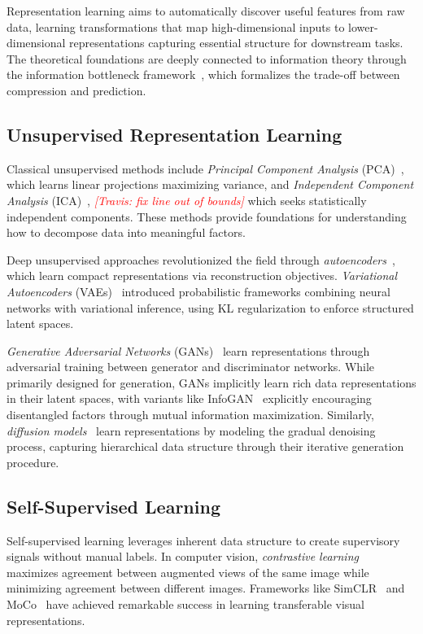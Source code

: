 \documentclass[11pt, oneside]{book}
\theoremstyle{plain}
\theoremstyle{definition}
\theoremstyle{remark}
\newcommand{\travis}[1]{\textcolor{red}{{\it [Travis: #1]}}}
\begin{document}
Representation learning aims to automatically discover useful features from raw data, learning transformations that map high-dimensional inputs to lower-dimensional representations capturing essential structure for downstream tasks. The theoretical foundations are deeply connected to information theory through the information bottleneck framework~\citep{tishby2000information}, which formalizes the trade-off between compression and prediction.

\subsection{Unsupervised Representation Learning}

Classical unsupervised methods include \emph{Principal Component Analysis} (PCA)~\citep{pearson1901liii}, which learns linear projections maximizing variance, and \emph{Independent Component Analysis} (ICA)~\citep{hyvarinen2000independent}, \travis{fix line out of bounds} which seeks statistically independent components. These methods provide foundations for understanding how to decompose data into meaningful factors.

Deep unsupervised approaches revolutionized the field through \emph{autoencoders}~\citep{hinton2006reducing}, which learn compact representations via reconstruction objectives. \emph{Variational Autoencoders} (VAEs)~\citep{kingma2014auto,rezende2014stochastic} introduced probabilistic frameworks combining neural networks with variational inference, using KL regularization to enforce structured latent spaces.

\emph{Generative Adversarial Networks} (GANs)~\citep{goodfellow2014generative} learn representations through adversarial training between generator and discriminator networks. While primarily designed for generation, GANs implicitly learn rich data representations in their latent spaces, with variants like InfoGAN~\citep{chen2016infogan} explicitly encouraging disentangled factors through mutual information maximization. Similarly, \emph{diffusion models}~\citep{ho2020denoising,song2020score} learn representations by modeling the gradual denoising process, capturing hierarchical data structure through their iterative generation procedure.

\subsection{Self-Supervised Learning}

Self-supervised learning leverages inherent data structure to create supervisory signals without manual labels. In computer vision, \emph{contrastive learning}~\citep{chen2020simple,he2020momentum} maximizes agreement between augmented views of the same image while minimizing agreement between different images. Frameworks like SimCLR~\citep{chen2020simple} and MoCo~\citep{he2020momentum} have achieved remarkable success in learning transferable visual representations.
\end{document}
